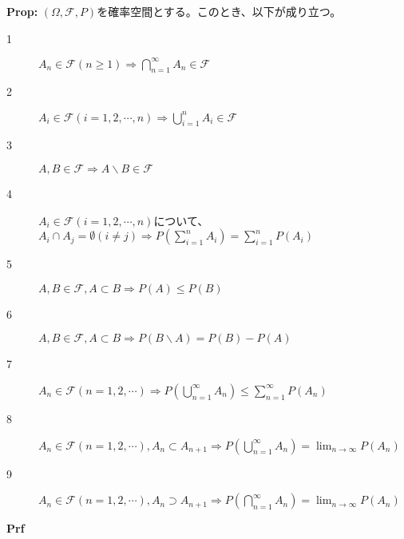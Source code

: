 \documentclass[a4paper,11pt]{jsarticle}
\numberwithin{equation}{section}
\begin{document}
\begin{itembox}[l]{\textbf{Prop:}}
$(\Omega, \mathcal{F}, P)$を確率空間とする。このとき、以下が成り立つ。\\
\begin{description}
  \item[1] $A_n \in \mathcal{F} (n\geq 1) \Rightarrow \bigcap_{n=1}^{\infty} A_n \in \mathcal{F}$
  \item[2] $A_i \in \mathcal{F} (i=1,2,\cdots,n) \Rightarrow \bigcup_{i=1}^{n} A_i \in \mathcal{F}$
  \item[3] $A,B \in \mathcal{F} \Rightarrow A\backslash B \in \mathcal{F}$
  \item[4] $A_i \in \mathcal{F} (i=1,2,\cdots,n) $について、$A_i \cap A_j = \emptyset (i \neq j) \Rightarrow P(\sum_{i=1}^{n} A_i) = \sum_{i=1}^{n} P(A_i)$
  \item[5] $A,B \in \mathcal{F} , A \subset B \Rightarrow P(A) \leq P(B)$
  \item[6] $A,B \in \mathcal{F} , A \subset B \Rightarrow P(B\backslash A) = P(B) - P(A)$
  \item[7] $A_n \in \mathcal{F} (n=1,2,\cdots) \Rightarrow P(\bigcup_{n=1}^{\infty} A_n) \leq \sum_{n=1}^{\infty} P(A_n)$
  \item[8] $A_n \in \mathcal{F} (n=1,2,\cdots), A_n \subset A_{n+1} \Rightarrow P(\bigcup_{n=1}^{\infty} A_n) = \lim_{n \to \infty} P(A_n)$
  \item[9] $A_n \in \mathcal{F} (n=1,2,\cdots), A_n \supset A_{n+1} \Rightarrow P(\bigcap_{n=1}^{\infty} A_n) = \lim_{n \to \infty} P(A_n)$
\end{description}
\end{itembox}
\textbf{Prf}\\
\end{document}
